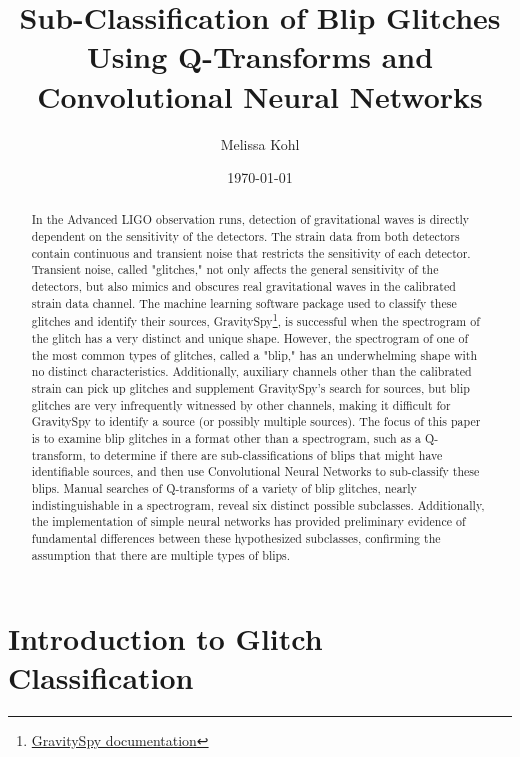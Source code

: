 \documentclass[a4paper]{article}
\title{Sub-Classification of Blip Glitches Using Q-Transforms and Convolutional Neural Networks}
\author{Melissa Kohl}
\date{\today}
\begin{document}
\maketitle
\graphicspath{ {images/} }

\begin{abstract}

In the Advanced LIGO observation runs, detection of gravitational waves is directly dependent on the sensitivity of the detectors. The strain data from both detectors contain continuous and transient noise that restricts the sensitivity of each detector. Transient noise, called "glitches," not only affects the general sensitivity of the detectors, but also mimics and obscures real gravitational waves in the calibrated strain data channel. The machine learning software package used to classify these glitches and identify their sources, GravitySpy\footnote{\href{https://gravity-spy.github.io}{GravitySpy documentation}}, is successful when the spectrogram of the glitch has a very distinct and unique shape. However, the spectrogram of one of the most common types of glitches, called a "blip," has an underwhelming shape with no distinct characteristics. Additionally, auxiliary channels other than the calibrated strain can pick up glitches and supplement GravitySpy's search for sources, but blip glitches are very infrequently witnessed by other channels, making it difficult for GravitySpy to identify a source (or possibly multiple sources). The focus of this paper is to examine blip glitches in a format other than a spectrogram, such as a Q-transform, to determine if there are sub-classifications of blips that might have identifiable sources, and then use Convolutional Neural Networks to sub-classify these blips. Manual searches of Q-transforms of a variety of blip glitches, nearly indistinguishable in a spectrogram, reveal six distinct possible subclasses. Additionally, the implementation of simple neural networks has provided preliminary evidence of fundamental differences between these hypothesized subclasses, confirming the assumption that there are multiple types of blips.

\end{abstract} 

\section{Introduction to Glitch Classification} \label{introduction}
\end{document}
